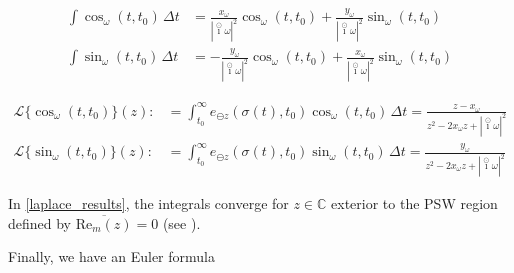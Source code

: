 \documentclass[reqno]{amsart}
\theoremstyle{plain}
\theoremstyle{definition}
\numberwithin{theorem}{section}
\numberwithin{definition}{section}
\numberwithin{prop}{section}
\numberwithin{example}{section}
\newcommand{\C}{\ensuremath{\mathbb{C}}}
\def\icirc{\overset{\odot}{\imath}}
\begin{document}
\begin{subequations}
\begin{align}
\int \cos_\omega(t,t_0) \, \Delta t & = \frac{x_\omega}{|\icirc \omega|^2}\cos_\omega(t,t_0)+\frac{y_\omega}{|\icirc \omega|^2}\sin_\omega(t,t_0) \\
\int \sin_\omega(t,t_0) \, \Delta t & = -\frac{y_\omega}{|\icirc \omega|^2}\cos_\omega(t,t_0)+\frac{x_\omega}{|\icirc \omega|^2}\sin_\omega(t,t_0)
\end{align}\label{integral_results}
\end{subequations}



\begin{subequations}
\begin{align}
\mathcal{L}\{\cos_\omega(t,t_0)\}(z): &= \int_{t_0}^{\infty}e_{\ominus z}(\sigma(t),t_0)\cos_\omega(t,t_0)\, \Delta t =\frac{z-x_\omega}{z^2-2x_\omega z+|\icirc \omega|^2} \\
\mathcal{L}\{\sin_\omega(t,t_0)\}(z): &= \int_{t_0}^{\infty}e_{\ominus z}(\sigma(t),t_0)\sin_\omega(t,t_0)\, \Delta t =\frac{y_\omega}{z^2-2x_\omega z+|\icirc \omega|^2}
\end{align}\label{laplace_results}
\end{subequations}


In \eqref{laplace_results}, the integrals converge for $z \in \C$ exterior to the PSW region defined by $\overline{\text{Re}_m(z)}=0$ (see \cite{JaDalap}).

Finally, we have an Euler formula
    
\end{document}

